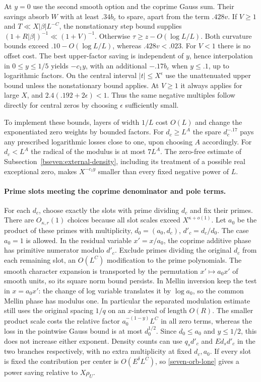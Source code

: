 \documentclass[11pt,a4paper]{article}
\theoremstyle{paperplain}
\numberwithin{equation}{section}
\begin{document}
At \(y=0\) use the second smooth option and the coprime Gauss sum.
Their savings absorb \(W\) with at least \(.34b_c\) to spare,
apart from the term \(.428v\). If \(V\ge1\) and
\(T\ll X|\beta|L^{-C}\), the nonstationary step bound supplies
\((1+R|\beta|)^{-1}\ll(1+V)^{-1}\). Otherwise \(\tau\ge z-O(\log L/L)\).
Both curvature bounds exceed \(.10-O(\log L/L)\), whereas
\(.428v<.023\). For \(V<1\) there is no offset cost. The best
upper-factor saving is independent of \(y\), hence interpolation
in \(0\le y\le 1/5\) yields \(-c_1y\), with an additional
\(-.17b_c\) when \(y\le .1\), up to logarithmic factors.
On the central interval \(|t|\le X^\epsilon\) use the unattenuated
upper bound unless the nonstationary bound applies. At \(V\ge1\)
it always applies for large \(X\), and \(2.4(.192+2\epsilon)<1\).
Thus the same negative multiples follow directly for central zeros
by choosing \(\epsilon\) sufficiently small.

To implement these bounds, layers of width \(1/L\) cost \(O(L)\)
and change the exponentiated zero weights by bounded factors. For
\(d_c\ge L^A\) the spare \(d_c^{-.17}\) pays any prescribed
logarithmic losses close to one, upon choosing \(A\) accordingly.
For $d_c<L^A$ the radical of the modulus is at most $7L^A$.
The zero-free estimate of Subsection~\ref{bseven:external-density},
including its treatment of a possible real exceptional zero, makes
$X^{-c_1y}$ smaller than every fixed negative power of $L$.

\paragraph{Prime slots meeting the coprime denominator and pole terms.}
For each \(d_c\), choose exactly the slots with prime dividing \(d_c\)
and fix their primes. There are \(O_{\kappa,r}(1)\) choices because
all slot scales exceed \(X^{\kappa+o(1)}\). Let \(a_0\) be the product
of these primes with multiplicity, \(d_0=(a_0,d_c)\),
\(d'_c=d_c/d_0\). The case \(a_0=1\) is allowed. In the residual variable
\(x'=x/a_0\), the coprime additive phase has primitive numerator
modulo \(d'_c\). Exclude primes dividing the original \(d_c\)
from each remaining slot, an \(O(L^C)\) modification to the prime
polynomials. The smooth character expansion is transported by the
permutation \(x'\mapsto a_0x'\) of smooth units, so its square norm
bound persists. In Mellin inversion keep the test in $x=a_0x'$:
the change of log variable translates it by $\log a_0$, so the common
Mellin phase has modulus one. In particular the separated modulation
estimate still uses the original spacing $1/q$ on an $x$-interval
of length $O(R)$. The
smaller product scale costs the relative factor \(a_0^{-(1-y)}L^C\)
in all zero terms, whereas the loss in the pointwise Gauss bound is
at most \(d_0^{1/2}\). Since \(d_0\le a_0\) and \(y\le1/2\),
this does not increase either exponent. Density counts can use
\(q_s d'_c\) and \(Ed_s d'_c\) in the two branches respectively,
with no extra multiplicity at fixed \(d_c,a_0\).
If every slot is fixed the contribution per center is
\(O(E^\delta L^C)\), so \eqref{seven-orb-lone} gives a power
saving relative to \(X\rho_U\).
\end{document}
